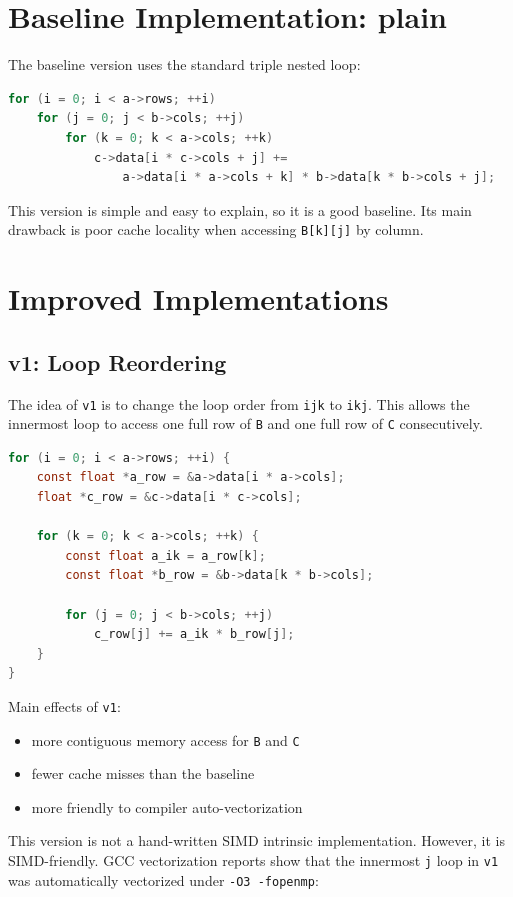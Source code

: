 \documentclass[11pt,a4paper]{article}
\begin{document}
\section{Baseline Implementation: plain}
The baseline version uses the standard triple nested loop:

\begin{lstlisting}[language=C]
for (i = 0; i < a->rows; ++i)
    for (j = 0; j < b->cols; ++j)
        for (k = 0; k < a->cols; ++k)
            c->data[i * c->cols + j] +=
                a->data[i * a->cols + k] * b->data[k * b->cols + j];
\end{lstlisting}

This version is simple and easy to explain, so it is a good baseline. Its main drawback is poor cache locality when accessing \texttt{B[k][j]} by column.

\section{Improved Implementations}
\subsection{v1: Loop Reordering}
The idea of \texttt{v1} is to change the loop order from \texttt{ijk} to \texttt{ikj}. This allows the innermost loop to access one full row of \texttt{B} and one full row of \texttt{C} consecutively.

\begin{lstlisting}[language=C]
for (i = 0; i < a->rows; ++i) {
    const float *a_row = &a->data[i * a->cols];
    float *c_row = &c->data[i * c->cols];

    for (k = 0; k < a->cols; ++k) {
        const float a_ik = a_row[k];
        const float *b_row = &b->data[k * b->cols];

        for (j = 0; j < b->cols; ++j)
            c_row[j] += a_ik * b_row[j];
    }
}
\end{lstlisting}

Main effects of \texttt{v1}:
\begin{itemize}
    \item more contiguous memory access for \texttt{B} and \texttt{C}
    \item fewer cache misses than the baseline
    \item more friendly to compiler auto-vectorization
\end{itemize}

This version is not a hand-written SIMD intrinsic implementation. However, it is SIMD-friendly. GCC vectorization reports show that the innermost \texttt{j} loop in \texttt{v1} was automatically vectorized under \texttt{-O3 -fopenmp}:
\end{document}
